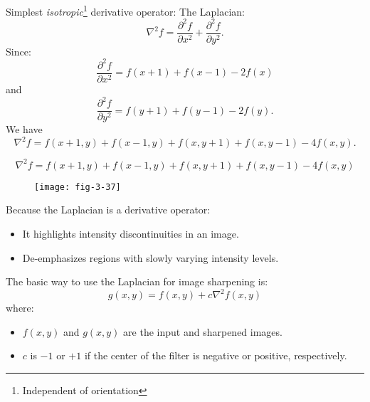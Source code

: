 \begin{frame}
Simplest \textit{isotropic}\footnote{Independent of orientation} derivative operator: The Laplacian:
\begin{equation}
\nabla^{2}f = \dfrac{\partial^{2} f}{\partial x^{2}} + \dfrac{\partial^{2}f}{\partial y^{2}}.
\end{equation}
Since:
\[
\dfrac{\partial^{2} f}{\partial x^{2}} = f(x+1) + f(x-1) - 2f(x)
\]
and
\[
\dfrac{\partial^{2} f}{\partial y^{2}} = f(y+1) + f(y-1) - 2f(y).
\]
We have
\begin{equation}
\boxed{\nabla^{2}f = f(x+1,y) + f(x-1,y) + f(x, y+1) + f(x,y-1) -4f(x,y)}.
\end{equation}
\end{frame}


\begin{frame}
\[
\boxed{\nabla^{2}f = f(x+1,y) + f(x-1,y) + f(x, y+1) + f(x,y-1) -4f(x,y)}
\]
\begin{figure}
\centering
\texttt{[image: fig-3-37]}
\end{figure}
\end{frame}


\begin{frame}
Because the Laplacian is a derivative operator: 
\begin{itemize}
\item It highlights intensity
discontinuities in an image.
\item De-emphasizes regions with slowly varying intensity levels.
\end{itemize}
The basic way to use the Laplacian for image sharpening is:
\begin{equation}
\boxed{
g(x,y) =  f(x,y) + c \nabla^{2} f(x,y)
}
\end{equation}
where:
\begin{itemize}
\item $f(x,y)$ and $g(x,y)$ are the input and sharpened images.
\item $c$ is $-1$ or $+1$ if the center of the filter is negative or positive, respectively.
\end{itemize}
\end{frame}


